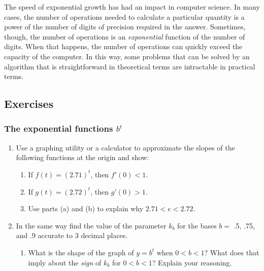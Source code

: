 The speed of exponential growth has had an impact in computer science.
In many cases, the number of operations needed to calculate a
particular quantity is a power of the number of digits of precision
required in the answer.  Sometimes, though, the number of operations
is an {\em exponential\/} function of the number of digits.  When that
happens, the number of operations can quickly exceed the capacity of
the computer.  In this way, some problems that can be solved by an
algorithm that is straightforward in theoretical terms are intractable
in practical terms.


\subsection{Exercises}
\label{subsec:exercises}

\subsubsection{The exponential functions $b^t$}
\label{subsubsec:the-exponential-functions-bt}



\begin{enumerate}
\item Use a graphing utility or a calculator to approximate the slopes of the following functions at the origin and show:


  \begin{enumerate}
  \item If  $f(t) = (2.71)^t$, then $f'(0)<1$.

  \item If  $g(t) = (2.72)^t$, then $g'(0)>1$.

  \item Use parts (a) and (b) to explain why $2.71 < e < 2.72$.



\end{enumerate}
\item In the same way find the value of the parameter $k_b$ for the bases $b =$ .5, .75, and .9 accurate to 3 decimal places.

  \begin{enumerate}
  \item What is the shape of the graph of $y=b^t$ when $0 < b < 1$?  What does that imply about the {\em sign\/} of $k_b$ for $0 < b < 1$?  Explain your reasoning.


\end{enumerate}
\end{enumerate}
